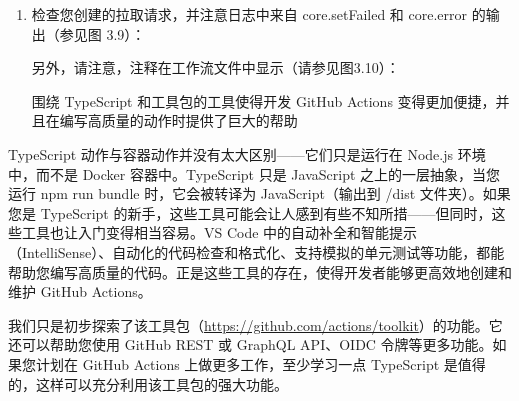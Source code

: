 \begin{enumerate}
\item 
检查您创建的拉取请求，并注意日志中来自 core.setFailed 和 core.error 的输出（参见图 3.9）：


另外，请注意，注释在工作流文件中显示（请参见图3.10）：


围绕 TypeScript 和工具包的工具使得开发 GitHub Actions 变得更加便捷，并且在编写高质量的动作时提供了巨大的帮助
\end{enumerate}


TypeScript 动作与容器动作并没有太大区别——它们只是运行在 Node.js 环境中，而不是 Docker 容器中。TypeScript 只是 JavaScript 之上的一层抽象，当您运行 npm run bundle 时，它会被转译为 JavaScript（输出到 /dist 文件夹）。如果您是 TypeScript 的新手，这些工具可能会让人感到有些不知所措——但同时，这些工具也让入门变得相当容易。VS Code 中的自动补全和智能提示（IntelliSense）、自动化的代码检查和格式化、支持模拟的单元测试等功能，都能帮助您编写高质量的代码。正是这些工具的存在，使得开发者能够更高效地创建和维护 GitHub Actions。


我们只是初步探索了该工具包（\url{https://github.com/actions/toolkit}）的功能。它还可以帮助您使用 GitHub REST 或 GraphQL API、OIDC 令牌等更多功能。如果您计划在 GitHub Actions 上做更多工作，至少学习一点 TypeScript 是值得的，这样可以充分利用该工具包的强大功能。
